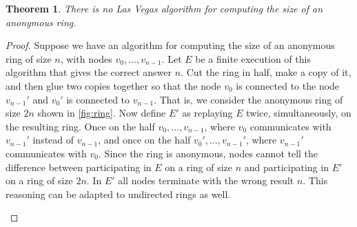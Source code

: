 \documentclass[a4paper,12pt]{article}
\newtheorem{theorem}{Theorem}
\begin{document}
\begin{theorem}
\label{thm:no-las-vegas-ring-size-algorithm}
There is no Las Vegas algorithm for computing the size of an anonymous ring.
\end{theorem}
\begin{proof}
Suppose we have an algorithm for computing the size of an anonymous ring of size $n$, with nodes $v_0,\dots,v_{n-1}$.
Let $E$ be a finite execution of this algorithm that gives the correct answer $n$.
Cut the ring in half, make a copy of it, and then glue two copies together so that the node $v_0$ is connected to the node $v_{n-1}'$ and $v_0'$ is connected to $v_{n-1}$.
That is, we consider the anonymous ring of size $2n$ shown in \ref{fig:ring}.
Now define $E'$ as replaying $E$ twice, simultaneously, on the resulting ring. Once on the half $v_0,\dots,v_{n-1}$, where $v_0$ communicates with $v_{n-1}'$ instead of $v_{n-1}$, and once on the half $v_0',\dots,v_{n-1}'$, where $v_{n-1}'$ communicates with $v_0$.
Since the ring is anonymous, nodes cannot tell the difference between participating in $E$ on a ring of size $n$ and participating in $E'$ on a ring of size $2n$. In $E'$ all nodes terminate with the wrong result $n$.
This reasoning can be adapted to undirected rings as well.

\begin{figure}
\centering
{}
\end{figure}
\end{proof}
\end{document}
